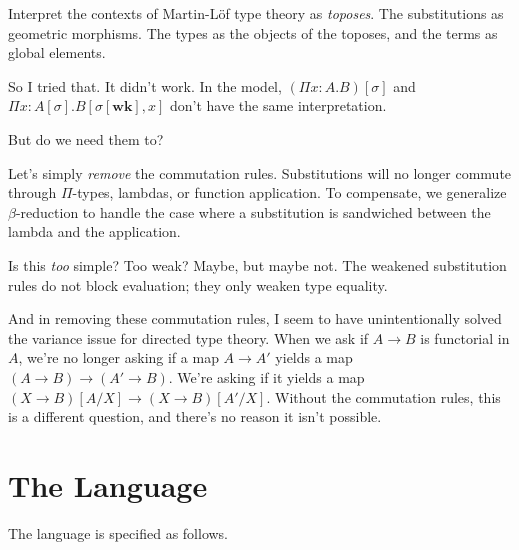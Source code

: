 \documentclass{article}
\begin{document}
Interpret the contexts of Martin-L\"of type theory as \emph{toposes}. The substitutions as geometric morphisms.
The types as the objects of the toposes, and the terms as global elements.

So I tried that. It didn't work. In the model, \((\Pi x : A. B)[\sigma]\)
and \(\Pi x : A[\sigma]. B[\sigma[\mathbf{wk}], x]\) don't have the same interpretation.

But do we need them to?

Let's simply \emph{remove} the commutation rules.
Substitutions will no longer commute through \(\Pi\)-types, lambdas, or function application.
To compensate, we generalize \(\beta\)-reduction to handle the case
where a substitution is sandwiched between the lambda and the application.

Is this \emph{too} simple? Too weak? Maybe, but maybe not.
The weakened substitution rules do not block evaluation;
they only weaken type equality.

And in removing these commutation rules,
I seem to have unintentionally solved the variance issue for directed type theory.
When we ask if \(A \to B\) is functorial in \(A\), we're no longer asking
if a map \(A \to A'\) yields a map \((A \to B) \to (A' \to B)\).
We're asking if it yields a map \((X \to B)[A/X] \to (X \to B)[A'/X]\).
Without the commutation rules, this is a different question,
and there's no reason it isn't possible.

\section{The Language}

\newcommand{\Cx}{\mathsf{Cx}}
\newcommand{\Sb}{\mathsf{Sb}}
\newcommand{\Ty}{\mathsf{Ty}}
\newcommand{\Tm}{\mathsf{Tm}}

The language is specified as follows.
\end{document}
